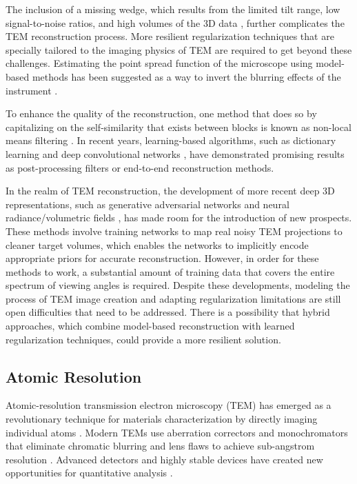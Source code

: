 \vspace{10pt}


The inclusion of a missing wedge, which results from the limited tilt range, low signal-to-noise ratios, and high volumes of the 3D data \cite{Fernandez2012}, further complicates the TEM reconstruction process. More resilient regularization techniques that are specially tailored to the imaging physics of TEM are required to get beyond these challenges. Estimating the point spread function of the microscope using model-based methods has been suggested as a way to invert the blurring effects of the instrument \cite{Fernandez2012}. 

\vspace{10pt}

To enhance the quality of the reconstruction, one method that does so by capitalizing on the self-similarity that exists between blocks is known as non-local means filtering \cite{Lawrence2006}. In recent years, learning-based algorithms, such as dictionary learning and deep convolutional networks \cite{Zhang2017}, have demonstrated promising results as post-processing filters or end-to-end reconstruction methods.
\vspace{15pt}

In the realm of TEM reconstruction, the development of more recent deep 3D representations, such as generative adversarial networks and neural radiance/volumetric fields \cite{Moawad2020}, has made room for the introduction of new prospects. These methods involve training networks to map real noisy TEM projections to cleaner target volumes, which enables the networks to implicitly encode appropriate priors for accurate reconstruction. However, in order for these methods to work, a substantial amount of training data that covers the entire spectrum of viewing angles is required. Despite these developments, modeling the process of TEM image creation and adapting regularization limitations are still open difficulties that need to be addressed. There is a possibility that hybrid approaches, which combine model-based reconstruction with learned regularization techniques, could provide a more resilient solution.

\vspace{10pt}


\clearpage
\subsection{Atomic Resolution}

Atomic-resolution transmission electron microscopy (TEM) has emerged as a revolutionary technique for materials characterization by directly imaging individual atoms \cite{Kawahara2022}. Modern TEMs use aberration correctors and monochromators that eliminate chromatic blurring and lens flaws to achieve sub-angstrom resolution \cite{Krivanek2010}. Advanced detectors and highly stable devices have created new opportunities for quantitative analysis \cite{Wastl2013}.

